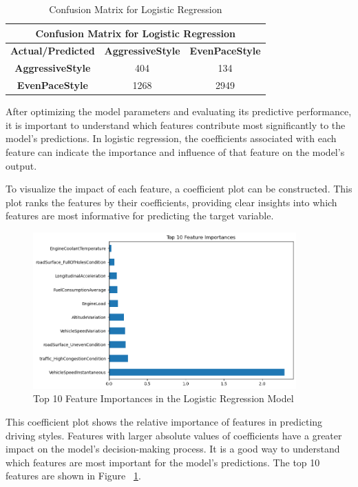 \begin{table}[H]
    \centering
    \begin{tabular}{|c|c|c|}
    \hline
    \multicolumn{3}{|c|}{\textbf{Confusion Matrix for Logistic Regression}} \\
    \hline
    \textbf{Actual/Predicted} & \textbf{AggressiveStyle} & \textbf{EvenPaceStyle} \\ \hline
    \textbf{AggressiveStyle} & 404 & 134 \\ \hline
    \textbf{EvenPaceStyle} & 1268 & 2949 \\ \hline
    \end{tabular}
    \caption{Confusion Matrix for Logistic Regression}
    \label{table:log_confusion_matrix}
\end{table}

After optimizing the model parameters and evaluating its predictive performance, it is important to understand which features contribute most significantly to the model's predictions. 
In logistic regression, the coefficients associated with each feature can indicate the importance and influence of that feature on the model's output. 

To visualize the impact of each feature, a coefficient plot can be constructed. This plot ranks the features by their coefficients, providing clear insights into which features are 
most informative for predicting the target variable.

\begin{figure}[H]
    \centering
    \includegraphics[width=0.9\textwidth]{images/feature_importance.png} 
    \caption{Top 10 Feature Importances in the Logistic Regression Model}
    \label{fig:feature_importances}
\end{figure}

This coefficient plot shows the relative importance of features in predicting driving styles. Features with larger absolute values of coefficients have a greater impact on the model's 
decision-making process. It is a good way to understand which features are most important for the model's predictions. The top 10 features are shown in Figure ~\ref{fig:feature_importances}.

